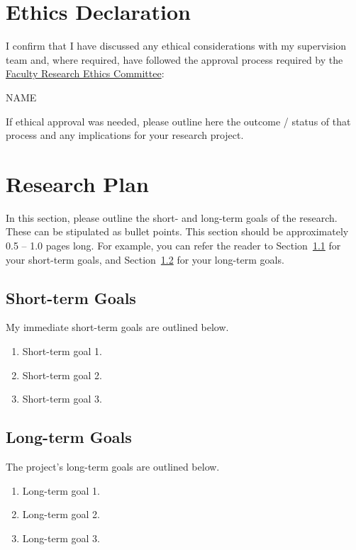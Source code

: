\documentclass[10pt]{article}
\begin{document}
\section*{Ethics Declaration}
I confirm that I have discussed any ethical considerations with my supervision team and, where required, have followed the approval process required by the \href{https://www.qub.ac.uk/Research/Governance-ethics-and-integrity/Ethics/FacultyResearchEthicsCommittees/}{Faculty Research Ethics Committee}:
\vspace{0.4 cm}

NAME

\vspace{0.4 cm}

If ethical approval was needed, please outline here the outcome / status of that process and any implications for your research project. 

\section{Research Plan}
In this section, please outline the short- and long-term goals of the research. These can be stipulated as bullet points. This section should be approximately 0.5 -- 1.0 pages long. For example, you can refer the reader to Section~{\ref{sec:shorttermgoals}} for your short-term goals, and Section~{\ref{sec:longtermgoals}} for your long-term goals.

\subsection{Short-term Goals}
\label{sec:shorttermgoals}
My immediate short-term goals are outlined below.
\begin{enumerate}
    \item Short-term goal 1.
    \item Short-term goal 2.
    \item Short-term goal 3.
\end{enumerate}

\subsection{Long-term Goals}
\label{sec:longtermgoals}
The project's long-term goals are outlined below.
\begin{enumerate}
    \item Long-term goal 1.
    \item Long-term goal 2.
    \item Long-term goal 3.
\end{enumerate}


\newpage

{}
\end{document}

